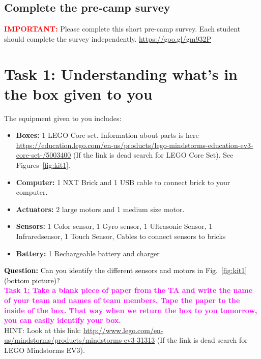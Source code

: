 \documentclass[11pt]{article}
\def\bluehref#1#2{\href{#1}{\color{blue} #2}}
\begin{document}
\subsection*{Complete the pre-camp survey}
\textcolor{red}{\bf IMPORTANT:}
Please complete this short pre-camp survey. Each student should complete the survey independently. 
\bluehref{https://goo.gl/gm932P}{https://goo.gl/gm932P}

\section*{Task 1: Understanding what's in the box given to you} The equipment given to you includes:

\begin{itemize}
\item {\bf Boxes:} 1 LEGO Core set. Information about parts is here \bluehref{https://education.lego.com/en-us/products/lego-mindstorms-education-ev3-core-set-/5003400}{https://education.lego.com/en-us/products/lego-mindstorms-education-ev3-core-set-/5003400} (If the link is dead search for LEGO Core Set). See Figures~\ref{fig:kit1}. %
\item {\bf Computer:} 1 NXT Brick and 1 USB cable to connect brick to your computer.
\item {\bf Actuators:} 2 large motors and 1 medium size motor.
\item {\bf Sensors:} 1 Color sensor, 1 Gyro sensor, 1 Ultrasonic Sensor, 1 Infraredsensor, 1 Touch Sensor, Cables to connect sensors to bricks
\item {\bf Battery:} 1 Rechargeable battery and charger
\end{itemize}
\textcolor{black}{{\bf Question:} Can you identify the different sensors and motors in Fig.~\ref{fig:kit1} (bottom picture)?} \\
\textcolor{magenta}{\bf Task 1: Take a blank piece of paper from the TA and write the name of your team and names of team members. Tape the paper to the inside of the box. That way when we return the box to you tomorrow, you can easily identify your box.} \\
HINT: Look at this link: \bluehref{http://www.lego.com/en-us/mindstorms/products/mindstorms-ev3-31313}{http://www.lego.com/en-us/mindstorms/products/mindstorms-ev3-31313} (If the link is dead search for LEGO Mindstorms EV3).
\end{document}
